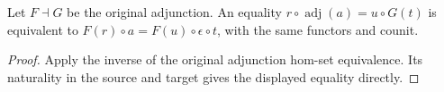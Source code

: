 \begin{lemma}
\label{lem:adjunction-square-from-unit-equation}
\leanok
Let $F\dashv G$ be the original adjunction. An equality
$r\circ\operatorname{adj}(a)=u\circ G(t)$ is equivalent to
$F(r)\circ a=F(u)\circ\epsilon\circ t$, with the same functors and counit.
\end{lemma}
\begin{proof}
Apply the inverse of the original adjunction hom-set equivalence. Its
naturality in the source and target gives the displayed equality directly.
\end{proof}
